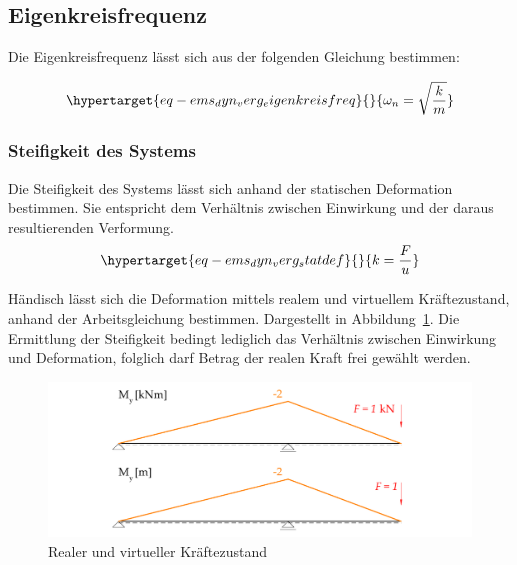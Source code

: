 \documentclass[
  letterpaper,
  DIV=11]{scrreprt}
\begin{document}
\hypertarget{eigenkreisfrequenz-2}{%
\subsection{Eigenkreisfrequenz}\label{eigenkreisfrequenz-2}}

Die Eigenkreisfrequenz lässt sich aus der folgenden Gleichung bestimmen:

\begin{equation}\protect\hypertarget{eq-ems_dyn_verg_eigenkreisfreq}{}{
\omega_n = \sqrt{\frac{k}{m}}
}\label{eq-ems_dyn_verg_eigenkreisfreq}\end{equation}

\hypertarget{steifigkeit-des-systems}{%
\subsubsection{Steifigkeit des Systems}\label{steifigkeit-des-systems}}

Die Steifigkeit des Systems lässt sich anhand der statischen Deformation
bestimmen. Sie entspricht dem Verhältnis zwischen Einwirkung und der
daraus resultierenden Verformung.
\begin{equation}\protect\hypertarget{eq-ems_dyn_verg_statdef}{}{
k = \frac{F}{u}
}\label{eq-ems_dyn_verg_statdef}\end{equation}

Händisch lässt sich die Deformation mittels realem und virtuellem
Kräftezustand, anhand der Arbeitsgleichung bestimmen. Dargestellt in
Abbildung~\ref{fig-ems_dyn_verg_arbeitssatz}. Die Ermittlung der
Steifigkeit bedingt lediglich das Verhältnis zwischen Einwirkung und
Deformation, folglich darf Betrag der realen Kraft frei gewählt werden.

\begin{figure}[H]

{\centering \includegraphics{index_files/mediabag/bilder/aufgabe_ems_dynamischer_vergroesserungsfaktor_my_my_fik.pdf}

}

\caption{\label{fig-ems_dyn_verg_arbeitssatz}Realer und virtueller
Kräftezustand}

\end{figure}
\end{document}
